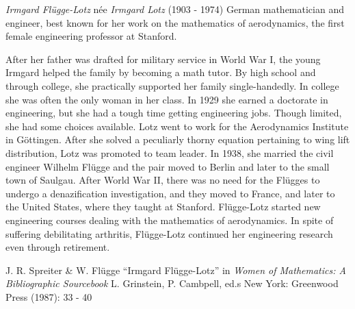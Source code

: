 \documentclass[12pt]{article}
\begin{document}
\emph{Irmgard Fl\"ugge-Lotz} n\'ee \emph{Irmgard Lotz} (1903 - 1974) German mathematician and engineer, best known for her work on the mathematics of aerodynamics, the first female engineering professor at Stanford.

After her father was drafted for military service in World War I, the young Irmgard helped the family by becoming a math tutor. By high school and through college, she practically supported her family single-handedly. In college she was often the only woman in her class. In 1929 she earned a doctorate in engineering, but she had a tough time getting engineering jobs. Though limited, she had some choices available. Lotz went to work for the Aerodynamics Institute in G\"ottingen. After she solved a peculiarly thorny equation pertaining to wing lift distribution, Lotz was promoted to team leader. In 1938, she married the civil engineer Wilhelm Fl\"ugge and the pair moved to Berlin and later to the small town of Saulgau. After World War II, there was no need for the Fl\"ugges to undergo a denazification investigation, and they moved to France, and later to the United States, where they taught at Stanford. Fl\"ugge-Lotz started new engineering courses dealing with the mathematics of aerodynamics. In spite of suffering debilitating arthritis, Fl\"ugge-Lotz continued her engineering research even through retirement.

\begin{thebibliography}{1}
 J. R. Spreiter \& W. Fl\"ugge ``Irmgard Fl\"ugge-Lotz'' in {\it Women of Mathematics: A Bibliographic Sourcebook} L. Grinstein, P. Cambpell, ed.s New York: Greenwood Press (1987): 33 - 40
\end{thebibliography}
\end{document}
